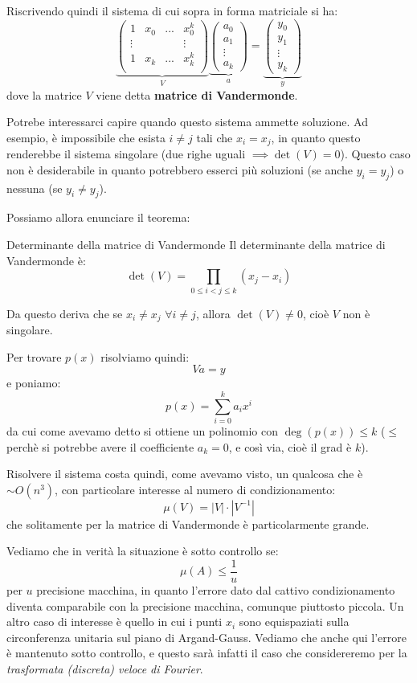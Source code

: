 \documentclass[a4paper,11pt]{article}
\begin{document}
Riscrivendo quindi il sistema di cui sopra in forma matriciale si ha:
$$
\underbrace{
\begin{pmatrix}
	1 & x_0 & ... & x_0^k \\
	\vdots  & & & \vdots\\
	1 & x_k & ... & x_k^k \\
\end{pmatrix}
}_V
\underbrace{
\begin{pmatrix}
	a_0 \\ a_1 \\ \vdots \\ a_k
\end{pmatrix}
}_a
=
\underbrace{
\begin{pmatrix}
	y_0 \\ y_1 \\ \vdots \\ y_k 
\end{pmatrix}
}_y
$$
dove la matrice $V$ viene detta \textbf{matrice di Vandermonde}.

Potrebe interessarci capire quando questo sistema ammette soluzione.
Ad esempio, è impossibile che esista $i \neq j$ tali che $x_i = x_j$, in quanto questo renderebbe il sistema singolare (due righe uguali $\implies \det(V) = 0$).
Questo caso non è desiderabile in quanto potrebbero esserci più soluzioni (se anche $y_i = y_j$) o nessuna (se $y_i \neq y_j$).

Possiamo allora enunciare il teorema:
\begin{theorem}{Determinante della matrice di Vandermonde}
	Il determinante della matrice di Vandermonde è:
	$$
	\det(V) = \prod_{0 \leq i < j \leq k} (x_j - x_i)
	$$
\end{theorem}

Da questo deriva che se $x_i \neq x_j$ $\forall i \neq j$, allora $\det(V) \neq 0$, cioè $V$ non è singolare.

Per trovare $p(x)$ risolviamo quindi:
$$
Va = y
$$
e poniamo:
$$
p(x) = \sum_{i = 0}^k a_i x^i
$$
da cui come avevamo detto si ottiene un polinomio con $\deg(p(x)) \leq k$ ($\leq$ perchè si potrebbe avere il coefficiente $a_k = 0$, e così via, cioè il grad è  $k$).

Risolvere il sistema costa quindi, come avevamo visto, un qualcosa che è $\sim O(n^3)$, con particolare interesse al numero di condizionamento:
$$
\mu(V) = |V| \cdot |V^{-1}|
$$
che solitamente per la matrice di Vandermonde è particolarmente grande.

Vediamo che in verità la situazione è sotto controllo se:
$$
\mu(A) \leq \frac{1}{u}
$$
per $u$ precisione macchina, in quanto l'errore dato dal cattivo condizionamento diventa comparabile con la precisione macchina, comunque piuttosto piccola.
Un altro caso di interesse è quello in cui i punti $x_i$ sono equispaziati sulla circonferenza unitaria sul piano di Argand-Gauss.
Vediamo che anche qui l'errore è mantenuto sotto controllo, e questo sarà infatti il caso che considereremo per la \textit{trasformata (discreta) veloce di Fourier}.
\end{document}
